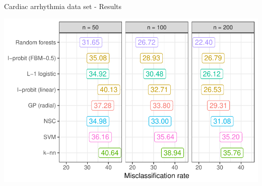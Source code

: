 \documentclass{beamer}\usepackage[]{graphicx}\usepackage[]{color}
\makeatletter
\def\maxwidth{ %
  \ifdim\Gin@nat@width>\linewidth
    \linewidth
  \else
    \Gin@nat@width
  \fi
}
\newenvironment{knitrout}{}{} %
\makeatother
\begin{document}
\begin{frame}[fragile]{Cardiac arrhythmia data set - Results}
\begin{knitrout}\small
{}\color{fgcolor}

{\centering \includegraphics[width=\maxwidth]{figure/cardiac-res-plot-1} 

}



\end{knitrout}
\end{frame}
\end{document}
